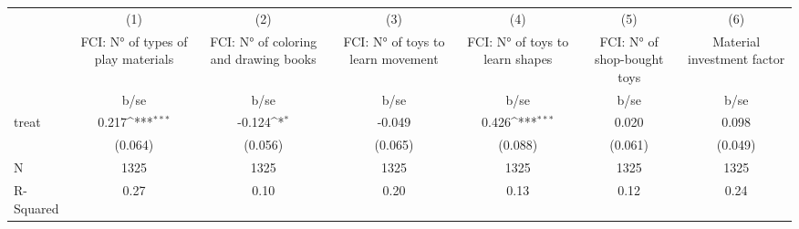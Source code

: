 {
\def\sym#1{\ifmmode^{#1}\else\(^{#1}\)\fi}
\begin{tabular}{l*{6}{c}}
\hline\hline
                    &\multicolumn{1}{c}{(1)}&\multicolumn{1}{c}{(2)}&\multicolumn{1}{c}{(3)}&\multicolumn{1}{c}{(4)}&\multicolumn{1}{c}{(5)}&\multicolumn{1}{c}{(6)}\\
                    &\multicolumn{1}{c}{FCI: N° of types of play materials}&\multicolumn{1}{c}{FCI: N° of coloring and drawing books}&\multicolumn{1}{c}{FCI: N° of toys to learn movement}&\multicolumn{1}{c}{FCI: N° of toys to learn shapes}&\multicolumn{1}{c}{FCI: N° of shop-bought toys}&\multicolumn{1}{c}{Material investment factor}\\
                    &        b/se         &        b/se         &        b/se         &        b/se         &        b/se         &        b/se         \\
\hline
treat               &       0.217\sym{***}&      -0.124\sym{*}  &      -0.049         &       0.426\sym{***}&       0.020         &       0.098         \\
                    &     (0.064)         &     (0.056)         &     (0.065)         &     (0.088)         &     (0.061)         &     (0.049)         \\
\hline
N                   &        1325         &        1325         &        1325         &        1325         &        1325         &        1325         \\
R-Squared           &        0.27         &        0.10         &        0.20         &        0.13         &        0.12         &        0.24         \\
\hline\hline
\end{tabular}
}
